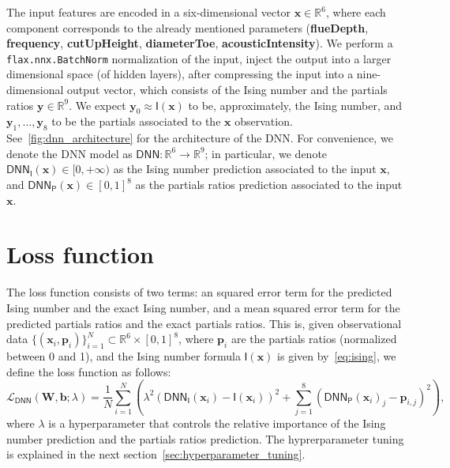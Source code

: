 \documentclass{psu-report}
\begin{document}
The input features are encoded in a six-dimensional vector
\(\mathbf{x} \in \mathbb{R}^6\), where each component corresponds to the
already mentioned parameters (\textbf{flueDepth}, \textbf{frequency},
\textbf{cutUpHeight}, \textbf{diameterToe}, \textbf{acousticIntensity}).
We perform a \texttt{flax.nnx.BatchNorm} normalization of the input,
inject the output into a larger dimensional space (of hidden layers),
after compressing the input into a nine-dimensional output vector,
which consists of the Ising number and the partials ratios
\(\mathbf{y} \in \mathbb{R}^9\).
We expect \(\mathbf{y}_0 \approx \mathsf{I}(\mathbf{x})\) to be, approximately,
the Ising number, and \(\mathbf{y}_1, \ldots, \mathbf{y}_8\) to be the partials
associated to the \(\mathbf{x}\) observation.
See~\autoref{fig:dnn_architecture} for the architecture of the DNN.
For convenience, we denote the DNN model as \(\mathsf{DNN}: \mathbb{R}^6 \to
\mathbb{R}^9\); in particular, we denote
\(\mathsf{DNN}_\mathsf{I}(\mathbf{x})\in [0, +\infty)\)
as the Ising number prediction associated to the input \(\mathbf{x}\), and
\(\mathsf{DNN}_\mathsf{P}(\mathbf{x}) \in [0, 1]^8\)
as the partials ratios prediction associated to the input \(\mathbf{x}\).



\section{Loss function}

The loss function consists of two terms: an squared error term for the
predicted Ising number and the exact Ising number, and a mean squared error term
for the predicted partials ratios and the exact partials ratios.
This is, given observational data \(\{ (\mathbf{x}_i, \mathbf{p}_i)\}_{i=1}^N
\subset \mathbb{R}^6 \times [0,1]^8\), where \(\mathbf{p}_i\) are the
partials ratios (normalized between 0 and 1), and the Ising number formula
\(\mathsf{I}(\mathbf{x})\) is given by~\eqref{eq:ising}, we define the loss
function as follows:
\begin{equation}
    \label{eq:dnn_loss}
    \mathscr{L}_\mathsf{DNN}(\mathbf{W}, \mathbf{b}; \lambda) =
    \frac{1}{N} \sum_{i=1}^N \left(
        \lambda^2 \left( \mathsf{DNN}_\mathsf{I}(\mathbf{x}_i) - \mathsf{I}(\mathbf{x}_i) \right)^2
        +
        \sum_{j=1}^8 \left( \mathsf{DNN}_\mathsf{P}(\mathbf{x}_i)_j - \mathbf{p}_{i,j} \right)^2
    \right),
\end{equation}
where \(\lambda\) is a hyperparameter that controls the relative importance of
the Ising number prediction and the partials ratios prediction.
The hyprerparameter tuning is explained in the next section~\autoref{sec:hyperparameter_tuning}.
\end{document}
